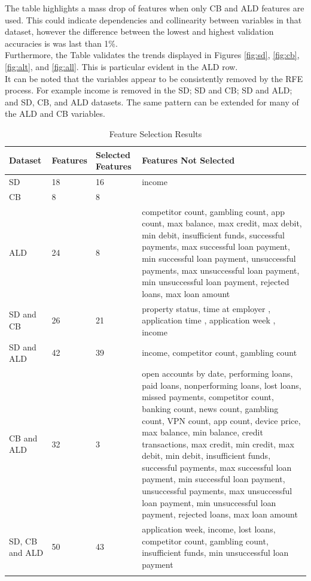 The table highlights a mass drop of features when only CB and ALD features are used. This could indicate dependencies and collinearity between variables in that dataset, however the difference between the lowest and highest validation accuracies is was last than 1\%.  \\

Furthermore, the Table validates the trends displayed in Figures \ref{fig:sd}, \ref{fig:cb}, \ref{fig:alt}, and \ref{fig:all}. This is particular evident in the ALD row. \\

It can be noted that the variables appear to be consistently removed by the RFE process. For example income is removed in the SD; SD and CB; SD and ALD; and SD, CB, and ALD datasets. The same pattern can be extended for many of the ALD and CB variables.  

\vspace{10pt}

\begin{longtable}{|p{3cm}|p{2cm}|p{2cm}|p{6cm}|} 
\hline
\multicolumn{1}{|p{3cm}|}{Dataset}
&\multicolumn{1}{|p{2cm}|}{Features}
&\multicolumn{1}{|p{2cm}|}{Selected Features}
&\multicolumn{1}{|p{6cm}|}{Features Not Selected}\\
\hline
SD & 18 & 16 & income   \\
\hline
CB & 8 & 8 &   \\
\hline
ALD & 24 & 8  & competitor count, gambling count, app count, max balance, max credit, max debit, min debit, insufficient funds,  successful payments, max successful loan payment, min  successful loan payment, unsuccessful payments, max unsuccessful loan payment, min unsuccessful loan payment, rejected loans, max loan amount \\
\hline
SD and CB & 26 & 21 & property status, time at employer , application time , application week , income \\
\hline
SD and ALD & 42 & 39 & income, competitor count, gambling count \\
\hline
CB and ALD & 32 & 3 &  open accounts by date, performing loans, paid loans, nonperforming loans, lost loans, missed payments, competitor count, banking count, news count, gambling count, VPN count, app count, device price, max balance, min balance, credit transactions, max credit, min credit, max debit, min debit, insufficient funds, successful payments, max successful loan payment, min successful loan payment, unsuccessful payments, max unsuccessful loan payment, min unsuccessful loan payment, rejected loans, max loan amount \\
\hline
SD, CB and ALD & 50 & 43 & application week, income, lost loans, competitor count, gambling count, insufficient funds, min unsuccessful loan payment\\
\hline
\caption{Feature Selection Results}
\label{table:features retained}
\end{longtable}

